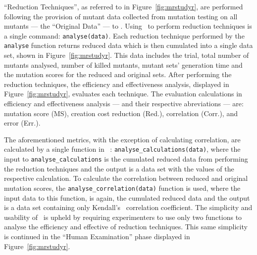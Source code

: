 ``Reduction Techniques'', as referred to in Figure~\ref{fig:mrstudyr}, are performed following the provision
of mutant data collected from mutation testing on all mutants --- the ``Original Data'' --- to \mr. Using
\mr~to perform reduction techniques is a single command: \texttt{analyse(data)}. Each reduction technique performed by
the \texttt{analyse} function returns reduced data which is then cumulated into a single data set, shown in Figure~\ref{fig:mrstudyr}.
This data includes the trial, total number of mutants analysed, number of killed mutants, mutant sets' generation time
and the mutation scores for the reduced and original sets. After performing the reduction techniques,
the efficiency and effectiveness analysis, displayed in Figure~\ref{fig:mrstudyr}, evaluates each technique.
The evaluation calculations in efficiency and effectiveness analysis --- and their respective abreviations --- are: mutation score
(MS), creation cost reduction (Red.), correlation (Corr.), and error (Err.).


The aforementioned metrics, with the exception of calculating correlation, are calculated by a single function in
\mr~: \texttt{analyse\_calculations(data)}, where the input to \texttt{analyse\_calculations} is the cumulated reduced
data from performing the reduction techniques and the output is a  data set with the values of the respective calculation.
To calculate the correlation between reduced and original mutation scores, the \texttt{analyse\_correlation(data)} function
is used, where the input data to this function, is again, the cumulated reduced data and the output is a data set containing
only Kendall's \taub~correlation coefficient. The simplicity and usability of \mr~is upheld by requiring experimenters to use
only two functions to analyse the efficiency and effective of reduction techniques. This same simplicity is continued
in the ``Human Examination'' phase displayed in Figure~\ref{fig:mrstudyr}.


